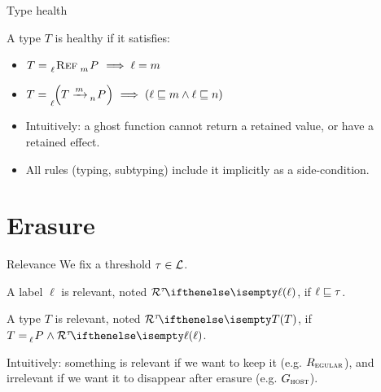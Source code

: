 \documentclass[aspectratio=169]{beamer}
\newcommand{\sectionimg}[0]{}
\renewcommand{\sectionimg}[0]{}
\let\sectionbase\section
\renewcommand{\section}[2][]{\renewcommand{\sectionimg}{#1}\sectionbase{#2}}
\begin{document}
\begin{frame}{Type health}
    \begin{definition}
        A type $T$ is \alert<1>{healthy} if it satisfies:
        \begin{itemize}
            \item $T = \reftype{\ell}{\type{\emm}{P}} \implies \ell = \emm$
            \item $T = \arrowtype{\ell}{T}{\emm}{\type{\enn}{P}} \implies (\ell \lsub \emm \land \ell \lsub \enn)$
        \end{itemize}
    \end{definition}

    \begin{itemize}
        \item<2-> Intuitively: a ghost function cannot return a retained value, or have a retained effect.
        \item<3-> All rules (typing, subtyping) include it implicitly as a side-condition.
    \end{itemize}
    
\end{frame}

\section{Erasure}

\begin{frame}{Relevance}
    We fix a threshold $\tau \in \mathcal{L}$.
    \begin{definition}[Relevance]
        A label $\ell$ is \alert<1>{relevant}, noted \alert<1>{$\relevance{\ell}$}, if $\ell \sqsubseteq \tau$.

        A type $T$ is \alert<1>{relevant}, noted \alert<1>{$\relevance{T}$}, if $T = \type{\ell}{P} \land \relevance{\ell}$.
    \end{definition}

    \pause

    Intuitively: something is relevant if we want to keep it (e.g. $R_{\textsc{egular}}$), and irrelevant if we want it to disappear after erasure (e.g. $G_{\textsc{host}}$).
\end{frame}
\end{document}
